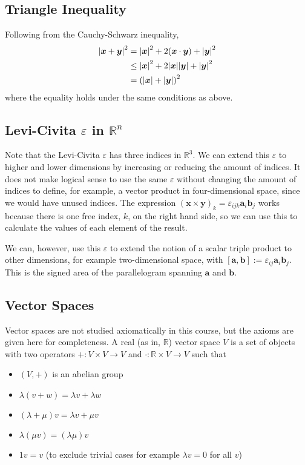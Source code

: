 \documentclass{article}
\begin{document}
\subsection{Triangle Inequality}
Following from the Cauchy-Schwarz inequality,
\begin{align*}
	\abs{\bm x + \bm y}^2
	 & = \abs{\bm x}^2 + 2(\bm x \cdot \bm y) + \abs{\bm y}^2        \\
	 & \leq \abs{\bm x}^2 + 2 \abs{\bm x}\abs{\bm y} + \abs{\bm y}^2 \\
	 & = \left(\abs{\bm x} + \abs{\bm y}\right)^2
\end{align*}
where the equality holds under the same conditions as above.

\subsection{Levi-Civita $\varepsilon$ in $\mathbb R^n$}
Note that the Levi-Civita $\varepsilon$ has three indices in $\mathbb R^3$. We can extend this $\varepsilon$ to higher and lower dimensions by increasing or reducing the amount of indices. It does not make logical sense to use the same $\varepsilon$ without changing the amount of indices to define, for example, a vector product in four-dimensional space, since we would have unused indices. The expression $(\bm x \times \bm y)_k = \varepsilon_{ijk} \bm a_i \bm b_j$ works because there is one free index, $k$, on the right hand side, so we can use this to calculate the values of each element of the result.

We can, however, use this $\varepsilon$ to extend the notion of a scalar triple product to other dimensions, for example two-dimensional space, with $[\bm a, \bm b] := \varepsilon_{ij} \bm a_i \bm b_j$. This is the signed area of the parallelogram spanning $\bm a$ and $\bm b$.

\subsection{Vector Spaces}
Vector spaces are not studied axiomatically in this course, but the axioms are given here for completeness. A real (as in, $\mathbb R$) vector space $V$ is a set of objects with two operators $+: V \times V \to V$ and $\cdot: \mathbb R \times V \to V$ such that
\begin{itemize}
	\item $(V, +)$ is an abelian group
	\item $\lambda(v + w) = \lambda v + \lambda w$
	\item $(\lambda + \mu)v = \lambda v + \mu v$
	\item $\lambda(\mu v) = (\lambda \mu) v$
	\item $1v = v$ (to exclude trivial cases for example $\lambda v = 0$ for all $v$)
\end{itemize}
\end{document}
